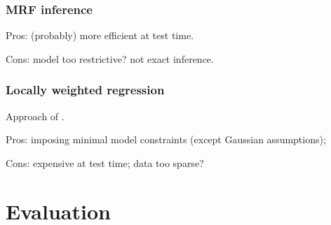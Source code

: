 \documentclass[runningheads]{llncs}
\begin{document}
\subsubsection{MRF inference}
Pros: (probably) more efficient at test time.

Cons: model too restrictive? not exact inference.

\subsubsection{Locally weighted regression}
Approach of \cite{Gao2011}.

Pros: imposing minimal model constraints (except Gaussian assumptions); 

Cons: expensive at test time; data too sparse?

\section{Evaluation} \label{sec:evaluation}



\end{document}
